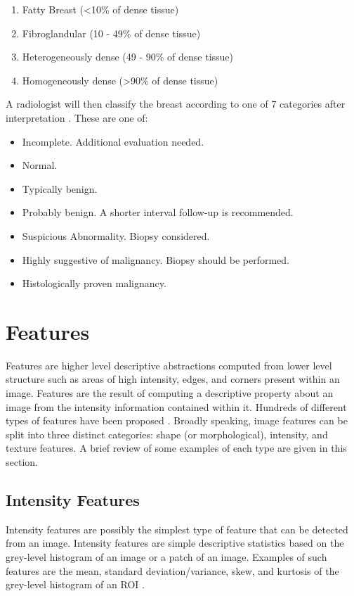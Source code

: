 \begin{enumerate}
	\item Fatty Breast (\textless10\% of dense tissue)
	\item Fibroglandular (10 - 49\% of dense tissue)
	\item Heterogeneously dense (49 - 90\% of dense tissue)
	\item Homogeneously dense (\textgreater 90\% of dense tissue)
\end{enumerate}

A radiologist will then classify the breast according to one of 7 categories after interpretation \cite{balleyguier2007birads}. These are one of:

\begin{itemize}
	\item Incomplete. Additional evaluation needed.
	\item Normal. 
	\item Typically benign.
	\item Probably benign. A shorter interval follow-up is recommended.
	\item Suspicious Abnormality. Biopsy considered.
	\item Highly suggestive of malignancy. Biopsy should be performed.
	\item Histologically proven malignancy.
\end{itemize}

\section{Features}
\label{sec:features}
Features are higher level descriptive abstractions computed from lower level structure such as areas of high intensity, edges, and corners present within an image. Features are the result of computing a descriptive property about an image from the intensity information contained within it. Hundreds of different types of features have been proposed \cite{cheng2006approaches, ganesan2013computer}. Broadly speaking, image features can be split into three distinct categories: shape (or morphological), intensity, and texture features. A brief review of some examples of each type are given in this section.


\subsection{Intensity Features}
Intensity features are possibly the simplest type of feature that can be detected from an image. Intensity features are simple descriptive statistics based on the grey-level histogram of an image or a patch of an image. Examples of such features are the mean, standard deviation/variance, skew, and kurtosis of the grey-level histogram of an ROI \cite{cheng2006approaches, christoyianni2000fast}.


